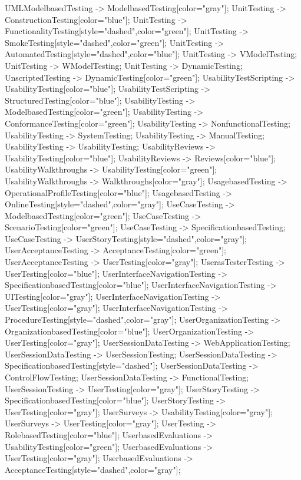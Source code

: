 \documentclass{article}
\begin{document}
{UMLModelbasedTesting -> ModelbasedTesting[color="gray"];
UnitTesting -> ConstructionTesting[color="blue"];
UnitTesting -> FunctionalityTesting[style="dashed",color="green"];
UnitTesting -> SmokeTesting[style="dashed",color="green"];
UnitTesting -> AutomatedTesting[style="dashed",color="blue"];
UnitTesting -> VModelTesting;
UnitTesting -> WModelTesting;
UnitTesting -> DynamicTesting;
UnscriptedTesting -> DynamicTesting[color="green"];
UsabilityTestScripting -> UsabilityTesting[color="blue"];
UsabilityTestScripting -> StructuredTesting[color="blue"];
UsabilityTesting -> ModelbasedTesting[color="green"];
UsabilityTesting -> ConformanceTesting[color="green"];
UsabilityTesting -> NonfunctionalTesting;
UsabilityTesting -> SystemTesting;
UsabilityTesting -> ManualTesting;
UsabilityTesting -> UsabilityTesting;
UsabilityReviews -> UsabilityTesting[color="blue"];
UsabilityReviews -> Reviews[color="blue"];
UsabilityWalkthroughs -> UsabilityTesting[color="green"];
UsabilityWalkthroughs -> Walkthroughs[color="gray"];
UsagebasedTesting -> OperationalProfileTesting[color="blue"];
UsagebasedTesting -> OnlineTesting[style="dashed",color="gray"];
UseCaseTesting -> ModelbasedTesting[color="green"];
UseCaseTesting -> ScenarioTesting[color="green"];
UseCaseTesting -> SpecificationbasedTesting;
UseCaseTesting -> UserStoryTesting[style="dashed",color="gray"];
UserAcceptanceTesting -> AcceptanceTesting[color="green"];
UserAcceptanceTesting -> UserTesting[color="gray"];
UserasTesterTesting -> UserTesting[color="blue"];
UserInterfaceNavigationTesting -> SpecificationbasedTesting[color="blue"];
UserInterfaceNavigationTesting -> UITesting[color="gray"];
UserInterfaceNavigationTesting -> UserTesting[color="gray"];
UserInterfaceNavigationTesting -> ProcedureTesting[style="dashed",color="gray"];
UserOrganizationTesting -> OrganizationbasedTesting[color="blue"];
UserOrganizationTesting -> UserTesting[color="gray"];
UserSessionDataTesting -> WebApplicationTesting;
UserSessionDataTesting -> UserSessionTesting;
UserSessionDataTesting -> SpecificationbasedTesting[style="dashed"];
UserSessionDataTesting -> ControlFlowTesting;
UserSessionDataTesting -> FunctionalTesting;
UserSessionTesting -> UserTesting[color="gray"];
UserStoryTesting -> SpecificationbasedTesting[color="blue"];
UserStoryTesting -> UserTesting[color="gray"];
UserSurveys -> UsabilityTesting[color="gray"];
UserSurveys -> UserTesting[color="gray"];
UserTesting -> RolebasedTesting[color="blue"];
UserbasedEvaluations -> UsabilityTesting[color="green"];
UserbasedEvaluations -> UserTesting[color="gray"];
UserbasedEvaluations -> AcceptanceTesting[style="dashed",color="gray"];
}
\end{document}
